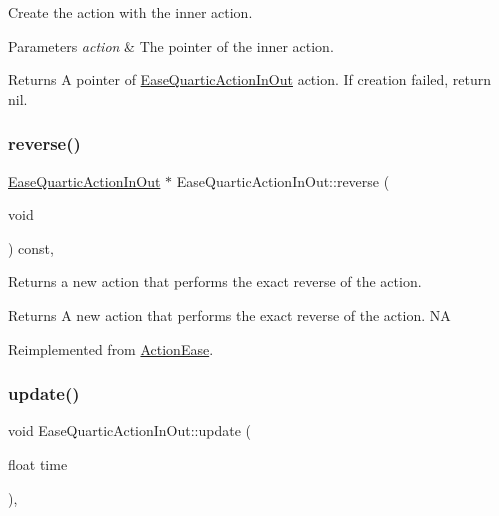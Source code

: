 Create the action with the inner action. 


\begin{DoxyParams}{Parameters}
{\em action} & The pointer of the inner action. \\
\hline
\end{DoxyParams}
\begin{DoxyReturn}{Returns}
A pointer of \hyperlink{classEaseQuarticActionInOut}{Ease\+Quartic\+Action\+In\+Out} action. If creation failed, return nil. 
\end{DoxyReturn}
\mbox{\label{classEaseQuarticActionInOut_a71b1f0c1807a96a6c1c6903810357d68}} 
\subsubsection{\texorpdfstring{reverse()}{reverse()}}
{\footnotesize\ttfamily \hyperlink{classEaseQuarticActionInOut}{Ease\+Quartic\+Action\+In\+Out} $\ast$ Ease\+Quartic\+Action\+In\+Out\+::reverse (\begin{DoxyParamCaption}\item[{void}]{ }\end{DoxyParamCaption}) const\hspace{0.3cm}{\ttfamily [override]}, {\ttfamily [virtual]}}

Returns a new action that performs the exact reverse of the action.

\begin{DoxyReturn}{Returns}
A new action that performs the exact reverse of the action.  NA 
\end{DoxyReturn}


Reimplemented from \hyperlink{classActionEase_ab99eb083fa033fae1d6c948fdc730782}{Action\+Ease}.

\mbox{\label{classEaseQuarticActionInOut_a331f286f05a385660f6bff75d5665178}} 
\subsubsection{\texorpdfstring{update()}{update()}}
{\footnotesize\ttfamily void Ease\+Quartic\+Action\+In\+Out\+::update (\begin{DoxyParamCaption}\item[{float}]{time }\end{DoxyParamCaption})\hspace{0.3cm}{\ttfamily [override]}, {\ttfamily [virtual]}}


